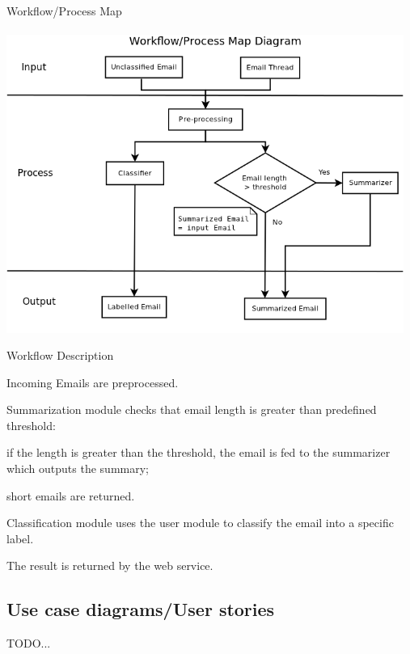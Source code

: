\documentclass[a4paper,10pt]{article}
\newenvironment{my_itemize}
{\begin{itemize}
  \setlength{\itemsep}{0cm}
  \setlength{\parskip}{0cm}}
{\end{itemize}}
\newenvironment{my_enumerate}
{\begin{enumerate}
  \setlength{\itemsep}{0cm}
  \setlength{\parskip}{0cm}}
{\end{enumerate}}
\begin{document}
\begin{my_enumerate}
  \item Workflow/Process Map \\ \\
	\includegraphics[width=13cm]{workflow_process_map.png}
  \item Workflow Description
  \begin{my_itemize}
    \item Incoming Emails are preprocessed.
    \item Summarization module checks that email length is greater than predefined threshold:
    \begin{my_itemize}
      \item if the length is greater than the threshold, the email is fed to the 
	    summarizer which outputs the summary;
      \item short emails are returned.
    \end{my_itemize}
    \item Classification module uses the user module to classify the email into a specific label.
    \item The result is returned by the web service.
  \end{my_itemize}
\end{my_enumerate}

\subsection{Use case diagrams/User stories}
TODO...
\end{document}
